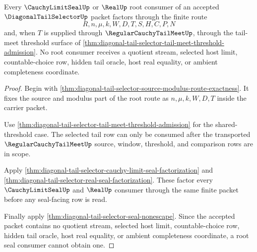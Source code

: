 \begin{theorem}
\label{thm:diagonal-tail-selector-root-seal-consumer-exhaustion}
Every $\CauchyLimitSealUp$ or $\RealUp$ root consumer of an accepted
$\DiagonalTailSelectorUp$ packet factors through the finite route
$$
R,n,\mu,k,W,D,T,S,H,C,P,N
$$
and, when $T$ is supplied through $\RegularCauchyTailMeetUp$, through the
tail-meet threshold surface of
\autoref{thm:diagonal-tail-selector-tail-meet-threshold-admission}. No root
consumer receives a quotient stream, selected host limit, countable-choice
row, hidden tail oracle, host real equality, or ambient completeness
coordinate.
\end{theorem}
\begin{proof}
Begin with
\autoref{thm:diagonal-tail-selector-source-modulus-route-exactness}. It fixes
the source and modulus part of the root route as $n,\mu,k,W,D,T$ inside the
carrier packet.

Use \autoref{thm:diagonal-tail-selector-tail-meet-threshold-admission} for
the shared-threshold case. The selected tail row can only be consumed after
the transported $\RegularCauchyTailMeetUp$ source, window, threshold, and
comparison rows are in scope.

Apply \autoref{thm:diagonal-tail-selector-cauchy-limit-seal-factorization}
and \autoref{thm:diagonal-tail-selector-real-seal-factorization}. These
factor every $\CauchyLimitSealUp$ and $\RealUp$ consumer through the same
finite packet before any seal-facing row is read.

Finally apply \autoref{thm:diagonal-tail-selector-seal-nonescape}. Since the
accepted packet contains no quotient stream, selected host limit,
countable-choice row, hidden tail oracle, host real equality, or ambient
completeness coordinate, a root seal consumer cannot obtain one.
\end{proof}


